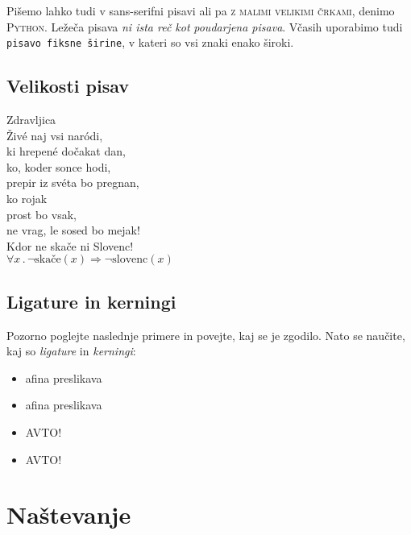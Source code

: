 \documentclass[a4paper]{article}
\begin{document}
Pišemo lahko tudi v \textsf{sans-serifni pisavi} ali pa \textsc{z malimi velikimi črkami},
denimo \textsc{Python}. Ležeča pisava \textsl{ni ista reč kot} \emph{poudarjena pisava}.
Včasih uporabimo tudi \texttt{pisavo fiksne širine}, v kateri so vsi znaki enako široki.


\subsection{Velikosti pisav}

\begin{center}
{\Huge Zdravljica} \\
{\Huge Živé naj vsi naródi,} \\
{\huge ki hrepené dočakat dan,} \\
{\LARGE ko, koder sonce hodi,} \\
{\Large prepir iz svéta bo pregnan,} \\
{\large ko rojak} \\
{\normalsize prost bo vsak,} \\
{\footnotesize ne vrag, le sosed bo mejak!} \\
{\scriptsize Kdor ne skače ni Slovenc!} \\
{\tiny $\forall x \,.\, \lnot\mathrm{skače}(x) \Rightarrow \lnot\mathrm{slovenc}(x)$}
\end{center}

\subsection{Ligature in kerningi}

Pozorno poglejte naslednje primere in povejte, kaj se je zgodilo. Nato se naučite, kaj so
\emph{ligature} in \emph{kerningi}:
%
\begin{itemize}
\item afina preslikava
\item {a}{f}{i}{n}{a} preslikava
\item AVTO!
\item {A}{V}{T}{O}!
\end{itemize}


\section{Naštevanje}
\end{document}

